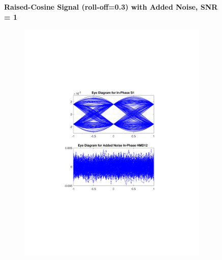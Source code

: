 \begin{refsection}
\begin{table}[H]
\begin{tabular}{|l|l|}
	\end{tabular}
\end{table}
\begin{figure}[H]
		\centering
	\textbf{Raised-Cosine Signal (roll-off=0.3) with Added Noise, SNR = 1}
	\begin{minipage}{\linewidth}
		\centering
	\begin{subfigure}{.45\textwidth}
		\centering
		\includegraphics[clip, trim=5cm 7cm 5cm 7cm, width=\textwidth]{./sdf/m_qam_system/figures/eyes/if_n_nmf_60_60_rc_03.pdf}
	\end{subfigure}
	\begin{subfigure}{.45\textwidth}
		\centering

\end{subfigure}
\end{minipage}
\end{figure}
\end{refsection}
